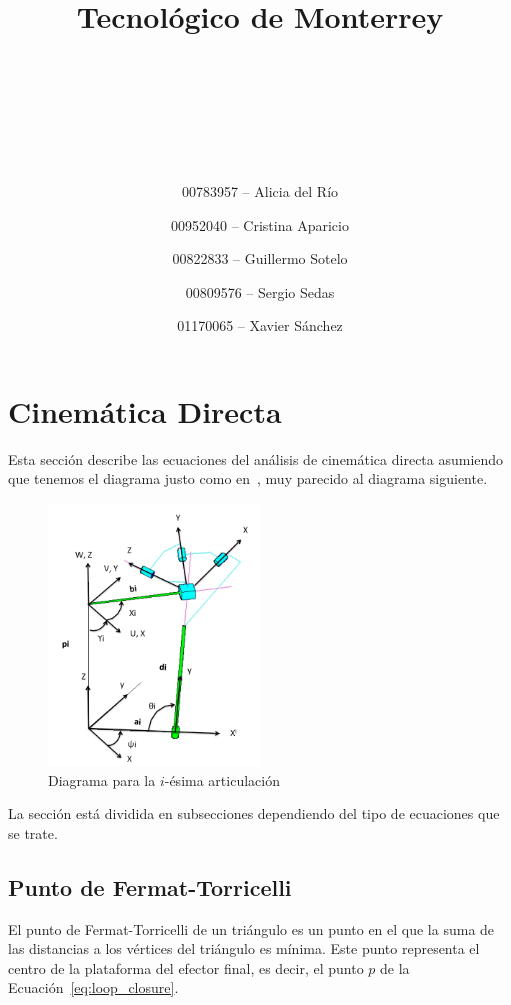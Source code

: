 \documentclass[titlepage, letterpaper, fleqn]{article}
\title{
\vspace{1in}
\textbf{Tecnológico de Monterrey} \\
\vspace{0.5in}
\textmd{\mahclass} \\
\large{\textit{\mahteacher}} \\
\vspace{0.5in}
\textsc{\mahtitle}\\
\author{00783957 -- Alicia del Río \\
\and 00952040 -- Cristina Aparicio \\
\and 00822833 -- Guillermo Sotelo \\
\and 00809576 -- Sergio Sedas \\
\and 01170065 -- Xavier Sánchez}
\date{\mahdate}
}
\begin{document}
\begin{titlepage}
\maketitle
\end{titlepage}

%
%

\section{Cinemática Directa} %
\label{sec:forward}

Esta sección describe las ecuaciones del análisis de cinemática directa asumiendo que tenemos el diagrama justo como en~\cite{Rodriguez-Leal2011}, muy parecido al diagrama siguiente.

\begin{figure}[htbp]
    \centering
    \includegraphics[width=0.5\textwidth]{02-diagram}
    \caption{Diagrama para la $i$-ésima articulación}
    \label{fig:label}
\end{figure}

La sección está dividida en subsecciones dependiendo del tipo de ecuaciones que se trate.

\subsection{Punto de Fermat-Torricelli}
\label{subsec:fermat-torricelli}

El punto de Fermat-Torricelli de un triángulo es un punto en el que la suma de las distancias a los vértices del triángulo es mínima.
Este punto representa el centro de la plataforma del efector final, es decir, el punto $p$ de la Ecuación~\ref{eq:loop_closure}.
\end{document}
